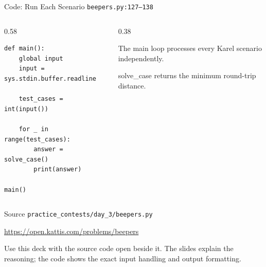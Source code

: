 \documentclass[aspectratio=169,11pt]{beamer}
\begin{document}
\begin{frame}[fragile]{Code: Run Each Scenario}
\scriptsize
{} \texttt{beepers.py:127--138}

\vspace{0.08cm}
\begin{columns}[T,totalwidth=\textwidth]
\begin{column}{0.58\textwidth}
\begin{lstlisting}[style=cpcode]
def main():
    global input
    input = sys.stdin.buffer.readline

    test_cases = int(input())

    for _ in range(test_cases):
        answer = solve_case()
        print(answer)

main()
\end{lstlisting}
\end{column}
\begin{column}{0.38\textwidth}
\begin{tightitemize}
  \item The main loop processes every Karel scenario independently.
  \item solve\_case returns the minimum round-trip distance.
\end{tightitemize}
\end{column}
\end{columns}
\end{frame}

\begin{frame}{Source}
\small
{} \texttt{practice\_contests/day\_3/beepers.py}

\vspace{0.3cm}
 \url{https://open.kattis.com/problems/beepers}

\vspace{0.45cm}
Use this deck with the source code open beside it. The slides explain the reasoning; the code shows the exact input handling and output formatting.
\end{frame}
\end{document}
